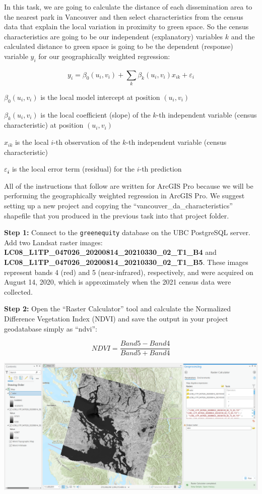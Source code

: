 \documentclass[
]{book}
\begin{document}
In this task, we are going to calculate the distance of each dissemination area to the nearest park in Vancouver and then select characteristics from the census data that explain the local variation in proximity to green space. So the census characteristics are going to be our independent (explanatory) variables \(k\) and the calculated distance to green space is going to be the dependent (response) variable \(y_i\) for our geographically weighted regression:

\[
y_i=𝛽_0(u_i,v_i)+\sum_{k}^{}𝛽_𝑘(u_i,v_i) 𝑥_{𝑖𝑘}+ε _𝑖
\]

\(𝛽_0(u_i,v_i)\) is the local model intercept at position \((u_i,v_i)\)

\(𝛽_k(u_i,v_i)\) is the local coefficient (slope) of the \(k\)-th independent variable (census characteristic) at position \((u_i,v_i)\)

\(𝑥_{𝑖𝑘}\) is the local \(i\)-th observation of the \(k\)-th independent variable (census characteristic)

\(ε _𝒊\) is the local error term (residual) for the \(i\)-th prediction

All of the instructions that follow are written for ArcGIS Pro because we will be performing the geographically weighted regression in ArcGIS Pro. We suggest setting up a new project and copying the ``vancouver\_da\_characteristics'' shapefile that you produced in the previous task into that project folder.

\textbf{Step 1:} Connect to the \texttt{greenequity} database on the UBC PostgreSQL server. Add two Landsat raster images: \textbf{LC08\_L1TP\_047026\_20200814\_20210330\_02\_T1\_B4} and \textbf{LC08\_L1TP\_047026\_20200814\_20210330\_02\_T1\_B5}. These images represent bands 4 (red) and 5 (near-infrared), respectively, and were acquired on August 14, 2020, which is approximately when the 2021 census data were collected.

\textbf{Step 2:} Open the ``Raster Calculator'' tool and calculate the Normalized Difference Vegetation Index (NDVI) and save the output in your project geodatabase simply as ``ndvi'':

\[
NDVI=\frac{Band5-Band4}{Band5+Band4}
\]

\includegraphics[width=1\linewidth]{images/05-arcgis-ndvi}
\end{document}
